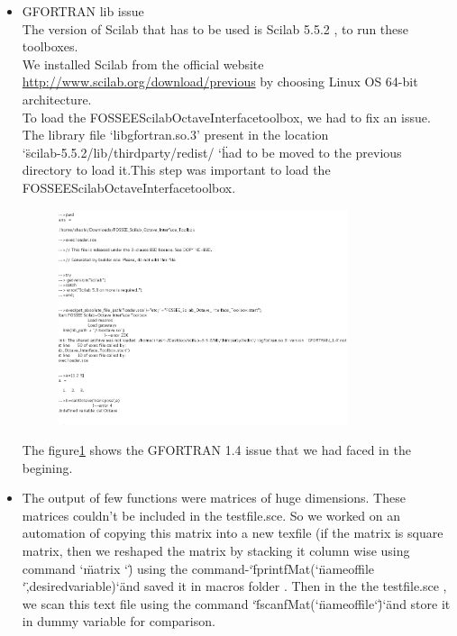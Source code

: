 \documentclass[12pt,a4paper]{report}
\begin{document}
\begin{itemize}
\item GFORTRAN lib issue\\
The version of Scilab that has to be used is Scilab 5.5.2 , to run these toolboxes.\\
We installed Scilab from the official website \url{http://www.scilab.org/download/previous} by choosing Linux OS 64-bit architecture. \\
To load the FOSSEE\textunderscore Scilab\textunderscore Octave\textunderscore Interface\textunderscore toolbox, we had to fix an issue. \\
The library file ‘libgfortran.so.3’ present in the location  \\ \char`\"scilab-5.5.2/lib/thirdparty/redist/  \char`\" 
 had to be moved to the previous directory to load it.This step was important to load the                       FOSSEE\textunderscore Scilab\textunderscore Octave\textunderscore Interface\textunderscore toolbox.

\begin{figure}[H]
\centering
\includegraphics[width = 0.8\textwidth]{gfortran.png}
\label{gfortran}
\end{figure}

The figure\ref{gfortran} shows the GFORTRAN 1.4 issue that we had faced in the begining.
\item The output of few functions were matrices of huge dimensions. These matrices couldn’t be included in the testfile.sce. So we worked on an automation of copying this matrix into a new texfile (if the matrix is square matrix, then we reshaped the matrix by stacking it column wise using command \char`\"matrix \char`\"  ) using the command-\char`\"fprintfMat(\char`\"name\textunderscore of\textunderscore file \char`\" ,desired\textunderscore variable)\char`\" and saved it in macros folder . Then in the the testfile.sce , we scan this text file using the command \char`\" fscanfMat(\char`\"name\textunderscore of\textunderscore file\char`\")\char`\"and store it in dummy variable for comparison.\\


\end{itemize}
\end{document}
